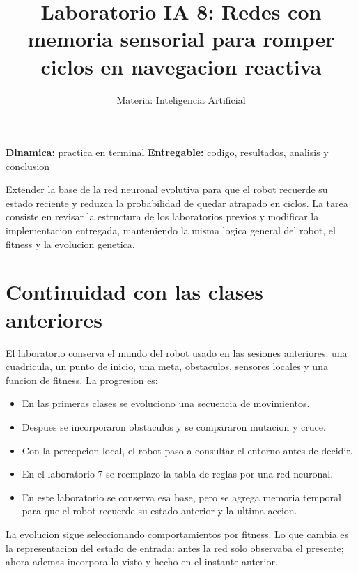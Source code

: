 \documentclass[11pt,a4paper]{article}
\title{\textbf{Laboratorio IA 8: Redes con memoria sensorial para romper ciclos en navegacion reactiva}}
\author{Materia: Inteligencia Artificial}
\date{}
\begin{document}
\maketitle

\begin{center}
  \textbf{Dinamica:} practica en terminal \quad
  \textbf{Entregable:} codigo, resultados, analisis y conclusion
\end{center}

\begin{objetivo}
Extender la base de la red neuronal evolutiva para que el robot recuerde su estado reciente y reduzca la probabilidad de quedar atrapado en ciclos. La tarea consiste en revisar la estructura de los laboratorios previos y modificar la implementacion entregada, manteniendo la misma logica general del robot, el fitness y la evolucion genetica.
\end{objetivo}

\section{Continuidad con las clases anteriores}
El laboratorio conserva el mundo del robot usado en las sesiones anteriores: una cuadricula, un punto de inicio, una meta, obstaculos, sensores locales y una funcion de fitness. La progresion es:

\begin{itemize}[leftmargin=*]
  \item En las primeras clases se evoluciono una secuencia de movimientos.
  \item Despues se incorporaron obstaculos y se compararon mutacion y cruce.
  \item Con la percepcion local, el robot paso a consultar el entorno antes de decidir.
  \item En el laboratorio 7 se reemplazo la tabla de reglas por una red neuronal.
  \item En este laboratorio se conserva esa base, pero se agrega memoria temporal para que el robot recuerde su estado anterior y la ultima accion.
\end{itemize}

\begin{idea}
La evolucion sigue seleccionando comportamientos por fitness. Lo que cambia es la representacion del estado de entrada: antes la red solo observaba el presente; ahora ademas incorpora lo visto y hecho en el instante anterior.
\end{idea}
\end{document}
